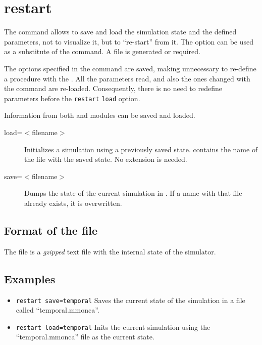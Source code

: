 \section{restart}
\label{sec:restart}

The  command allows to save and load the simulation state and the defined parameters, not to visualize it, but to ``re-start'' from it. The   option can be used as a substitute of the  command. A  file is generated or required.

The options specified in the  command are saved, making unnecessary to re-define a procedure with the . All the parameters read, and also the ones changed with the  command are re-loaded. Consequently, there is no need to redefine parameters before the {\tt restart} {\tt load} option.

Information from both  and  modules can be saved and loaded.

\begin{description}

\item[load=$<$filename$>$] Initializes a simulation using a previously saved state.  contains the name of the file with the saved state. No extension is needed.
\item[save=$<$filename$>$] Dumps the state of the current simulation in . If a name with that file already exists, it is overwritten.

\end{description}

\subsection{Format of the  file}

The  file is a {\em gzipped} text file with the internal state of the simulator. 

\subsection{Examples}
\begin{itemize}
\item \verb+restart save=temporal+ Saves the current state of the simulation in a file called ``temporal.mmonca''.
\item \verb+restart load=temporal+ Inits the current simulation using the ``temporal.mmonca'' file as the current state.
\end{itemize}
